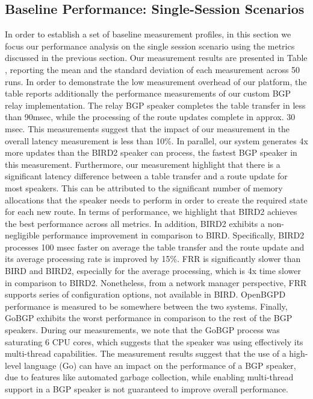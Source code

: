 \subsection{Baseline Performance: Single-Session Scenarios}
In order to establish a set of baseline measurement profiles, in this section we focus our performance analysis on the single session scenario using the metrics discussed in the previous section.
Our measurement results are presented in Table , reporting the mean and the standard deviation of each measurement across 50 runs.
In order to demonstrate the low measurement overhead of our platform, the table reports additionally the performance measurements of our custom BGP relay implementation.
The relay BGP speaker completes the table transfer in less than 90msec, while the processing of the route updates complete in approx.
30 msec.
This measurements suggest that the impact of our measurement in the overall latency measurement is less than 10\%.
In parallel, our system generates 4x more updates than the BIRD2 speaker can process, the fastest BGP speaker in this measurement.
Furthermore, our measurement highlight that there is a significant latency difference between a table transfer and a route update for most speakers.
This can be attributed to the significant number of memory allocations that the speaker needs to perform in order to create the required state for each new route.
In terms of performance, we highlight that BIRD2 achieves the best performance across all metrics.
In addition, BIRD2 exhibits a non-negligible performance improvement in comparison to BIRD.
Specifically, BIRD2 processes 100 msec faster on average the table transfer and the route update and its average processing rate is improved by 15\%.
FRR is significantly slower than BIRD and BIRD2, especially for the average processing, which is 4x time slower in comparison to BIRD2.
Nonetheless, from a network manager perspective, FRR supports series of configuration options, not available in BIRD.
OpenBGPD performance is measured to be somewhere between the two systems.
Finally, GoBGP exhibits the worst performance in comparison to the rest of the BGP speakers.
During our measurements, we note that the GoBGP process was saturating 6 CPU cores, which suggests that the speaker was using effectively its multi-thread capabilities.
The measurement results suggest that the use of a high-level language (Go) can have an impact on the performance of a BGP speaker, due to features like automated garbage collection, while enabling multi-thread support in a BGP speaker is not guaranteed to improve overall performance.

